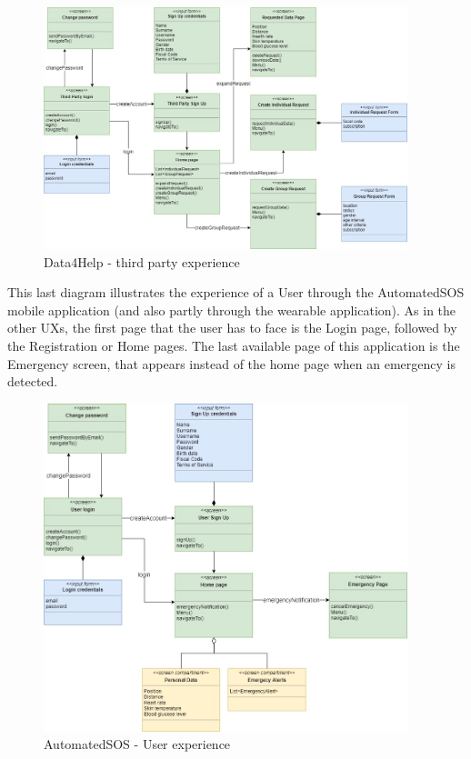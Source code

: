 \begin{figure}[ht]
    \centering
    \includegraphics[width=300pt]{images/UX/UX_Diagram2.jpg}
    \caption{Data4Help - third party experience}
    \label{UX2}
\end{figure}
\clearpage
\noindent This last diagram illustrates the experience of a User through the AutomatedSOS mobile application (and also partly through the wearable application). As in the other UXs, the first page that the user has to face is the Login page, followed by the Registration or Home pages. The last available page of this application is the Emergency screen, that appears instead of the home page when an emergency is detected.
\begin{figure}[ht]
    \centering
    \includegraphics[width=300pt]{images/UX/UX_Diagram3.jpg}
    \caption{AutomatedSOS - User experience}
    \label{UX3}
\end{figure}
\clearpage


